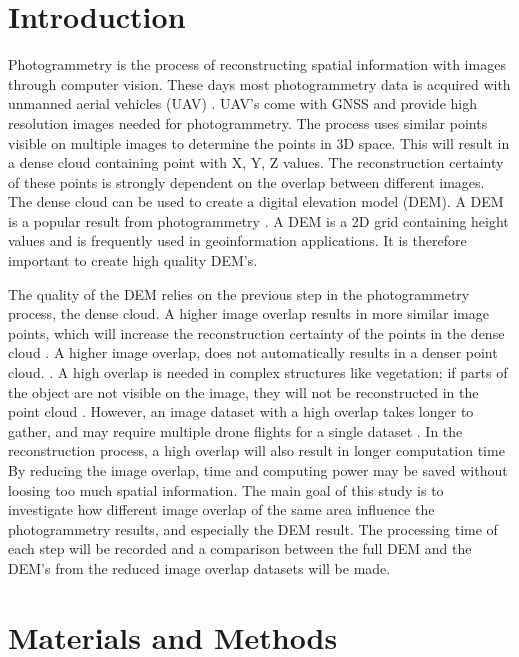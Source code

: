 \documentclass{isprs} %
\begin{document}
\section{Introduction}\label{Introduction}
Photogrammetry is the process of reconstructing spatial information with images through computer vision. 
These days most photogrammetry data is acquired with unmanned aerial vehicles (UAV) \citep{UAVAreMoreUsed}. 
UAV's come with GNSS and provide high resolution images needed for photogrammetry.
The process uses similar points visible on multiple images to determine the points in 3D space.
This will result in a dense cloud containing point with X, Y, Z values.
The reconstruction certainty of these points is strongly dependent on the overlap between different images.
The dense cloud can be used to create a digital elevation model (DEM).
A DEM is a popular result from photogrammetry \citep{DemIncrease1}.
A DEM is a 2D grid containing height values and is frequently used in geoinformation applications.
It is therefore important to create high quality DEM's.

The quality of the DEM relies on the previous step in the photogrammetry process, the dense cloud.
A higher image overlap results in more similar image points, which will increase the reconstruction certainty of the points in the dense cloud \citep{MoreOverMoreAcc}.
A higher image overlap, does not automatically results in a denser point cloud. \citep{EffectofUABimgcamover}. 
A high overlap is needed in complex structures like vegetation; if parts of the object are not visible on the image, they will not be reconstructed in the point cloud \citep{AccessingImageOverlap}.
However, an image dataset with a high overlap takes longer to gather, and may require multiple drone flights for a single dataset \citep{rosnell2012point}.
In the reconstruction process, a high overlap will also result in longer computation time \citep{AccessingImageOverlap}
By reducing the image overlap, time and computing power may be saved without loosing too much spatial information.
The main goal of this study is to investigate how different image overlap of the same area influence the photogrammetry results, and especially the DEM result.
The processing time of each step will be recorded and a comparison between the full DEM and the DEM's from the reduced image overlap datasets will be made.

\section{Materials and Methods}
\end{document}
